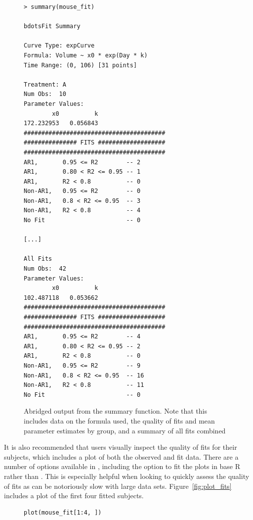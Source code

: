 \begin{singlespace}
\begin{figure}[H]
\centering
\begin{BVerbatim}
> summary(mouse_fit)

bdotsFit Summary

Curve Type: expCurve 
Formula: Volume ~ x0 * exp(Day * k) 
Time Range: (0, 106) [31 points]

Treatment: A 
Num Obs:  10 
Parameter Values: 
        x0          k 
172.232953   0.056843 
########################################
############### FITS ###################
########################################
AR1,       0.95 <= R2        -- 2 
AR1,       0.80 < R2 <= 0.95 -- 1 
AR1,       R2 < 0.8          -- 0 
Non-AR1,   0.95 <= R2        -- 0 
Non-AR1,   0.8 < R2 <= 0.95  -- 3 
Non-AR1,   R2 < 0.8          -- 4 
No Fit                       -- 0 

[...]

All Fits 
Num Obs:  42 
Parameter Values: 
        x0          k 
102.487118   0.053662 
########################################
############### FITS ###################
########################################
AR1,       0.95 <= R2        -- 4 
AR1,       0.80 < R2 <= 0.95 -- 2 
AR1,       R2 < 0.8          -- 0 
Non-AR1,   0.95 <= R2        -- 9 
Non-AR1,   0.8 < R2 <= 0.95  -- 16 
Non-AR1,   R2 < 0.8          -- 11 
No Fit                       -- 0 
\end{BVerbatim}
\caption{Abridged output from the summary function. Note that this includes data on the formula used, the quality of fits and mean parameter estimates by group, and a summary of all fits combined}
\end{figure}
\end{singlespace}

It is also recommended that users visually inspect the quality of fits for their subjects, which includes a plot of both the observed and fit data. There are a number of options available in , including the option to fit the plots in base R rather than . This is especially helpful when looking to quickly assess the quality of fits as  can be notoriously slow with large data sets. Figure~\ref{fig:plot_fits} includes a plot of the first four fitted subjects.


\begin{singlespace}
\begin{figure}[H]
\centering
\begin{BVerbatim}
plot(mouse_fit[1:4, ])
\end{BVerbatim}
\end{figure}
\end{singlespace}

